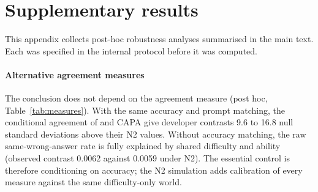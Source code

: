 \documentclass[preprint,12pt,authoryear]{elsarticle}
\begin{document}
\section{Supplementary results}
\label{sec:supp}
\normalsize
This appendix collects post-hoc robustness analyses summarised in the main text. Each was specified in the internal protocol before it was computed.

\paragraph{Alternative agreement measures} The conclusion does not depend on the agreement measure (post hoc, Table~\ref{tab:measures}). With the same accuracy and prompt matching, the conditional agreement of \citet{kim2025correlated} and CAPA \citep{goel2025great} give developer contrasts 9.6 to 16.8 null standard deviations above their N2 values. Without accuracy matching, the raw same-wrong-answer rate is fully explained by shared difficulty and ability (observed contrast 0.0062 against 0.0059 under N2). The essential control is therefore conditioning on accuracy; the N2 simulation adds calibration of every measure against the same difficulty-only world.

\begin{table}[!htbp]
\centering
\caption{H1 developer contrast under alternative agreement measures (MMLU, 70 models; post hoc). Observed contrast, its mean under a separate set of 200 N2 panels, and $z = $ (observed $-$ N2 mean)/N2 standard deviation.}
\label{tab:measures}
\small
{}
\end{table}
\end{document}
